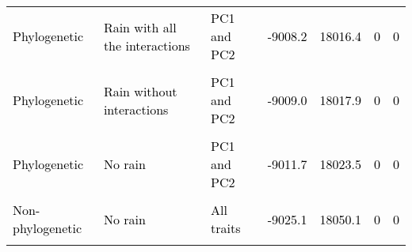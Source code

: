 \documentclass[
  12pt,
  letterpaper,
  DIV=11,
  numbers=noendperiod]{scrartcl}
\begin{document}
\begin{table}[H]
{\begin{tabular}[t]{lllllll}
\textcolor{black}{Phylogenetic} & \textcolor{black}{Rain with all the interactions} & \textcolor{black}{PC1 and PC2} & \textcolor{black}{-9008.2} & \textcolor{black}{18016.4} & \textcolor{black}{0} & \textcolor{black}{0}\\
\cellcolor{gray!6}{\textcolor{black}{Non-phylogenetic}} & \cellcolor{gray!6}{\textcolor{black}{Rain without interactions}} & \cellcolor{gray!6}{\textcolor{black}{PC1 and PC2}} & \cellcolor{gray!6}{\textcolor{black}{-9008.4}} & \cellcolor{gray!6}{\textcolor{black}{18016.8}} & \cellcolor{gray!6}{\textcolor{black}{0}} & \cellcolor{gray!6}{\textcolor{black}{0}}\\
\textcolor{black}{Phylogenetic} & \textcolor{black}{Rain without interactions} & \textcolor{black}{PC1 and PC2} & \textcolor{black}{-9009.0} & \textcolor{black}{18017.9} & \textcolor{black}{0} & \textcolor{black}{0}\\
\addlinespace
\cellcolor{gray!6}{\textcolor{black}{Non-phylogenetic}} & \cellcolor{gray!6}{\textcolor{black}{No rain}} & \cellcolor{gray!6}{\textcolor{black}{PC1 and PC2}} & \cellcolor{gray!6}{\textcolor{black}{-9010.2}} & \cellcolor{gray!6}{\textcolor{black}{18020.3}} & \cellcolor{gray!6}{\textcolor{black}{0}} & \cellcolor{gray!6}{\textcolor{black}{0}}\\
\textcolor{black}{Phylogenetic} & \textcolor{black}{No rain} & \textcolor{black}{PC1 and PC2} & \textcolor{black}{-9011.7} & \textcolor{black}{18023.5} & \textcolor{black}{0} & \textcolor{black}{0}\\
\cellcolor{gray!6}{\textcolor{black}{Non-phylogenetic}} & \cellcolor{gray!6}{\textcolor{black}{Rain with an interaction of cons}} & \cellcolor{gray!6}{\textcolor{black}{All traits}} & \cellcolor{gray!6}{\textcolor{black}{-9024.1}} & \cellcolor{gray!6}{\textcolor{black}{18048.3}} & \cellcolor{gray!6}{\textcolor{black}{0}} & \cellcolor{gray!6}{\textcolor{black}{0}}\\
\textcolor{black}{Non-phylogenetic} & \textcolor{black}{No rain} & \textcolor{black}{All traits} & \textcolor{black}{-9025.1} & \textcolor{black}{18050.1} & \textcolor{black}{0} & \textcolor{black}{0}\\
\cellcolor{gray!6}{\textcolor{black}{Non-phylogenetic}} & \cellcolor{gray!6}{\textcolor{black}{Rain with an interaction of cons and cona}} & \cellcolor{gray!6}{\textcolor{black}{All traits}} & \cellcolor{gray!6}{\textcolor{black}{-9025.7}} & \cellcolor{gray!6}{\textcolor{black}{18051.4}} & \cellcolor{gray!6}{\textcolor{black}{0}} & \cellcolor{gray!6}{\textcolor{black}{0}}\\

\end{tabular}}
\end{table}
\end{document}
